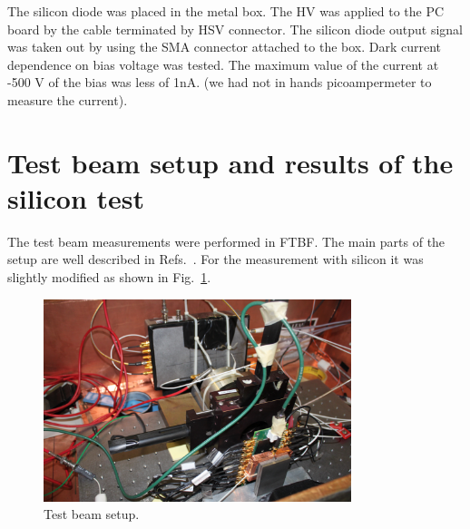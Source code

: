 \documentclass[12pt]{article}
\begin{document}
{The silicon diode was placed in the metal box. The HV was applied to the PC
board by the cable terminated by HSV connector. The silicon diode output signal
was taken out by using the SMA connector attached to the box. Dark current
dependence on bias voltage was tested. The maximum value of the current at -500
V of the bias was less of 1nA. (we had not in hands picoampermeter to measure
the current). \section{Test beam setup and results of the silicon test }
\label{sec:tbeam}

The test beam measurements were performed in FTBF. The main parts of the setup are well described in Refs.~\cite{Anderson:2015gha, MCPFastCaloNIMA, Ronzhin2015288,
Ronzhin201552}. For the measurement with silicon it was slightly modified as shown in Fig.~\ref{fig:SiliconPadTBeam}.

\begin{figure}[htbp] 
\centering
\includegraphics[width=0.8\textwidth]{plots/SiliconPadTestBeam.png} 
\caption{Test beam setup.} 
\label{fig:SiliconPadTBeam} 
\end{figure} 

}
\end{document}
